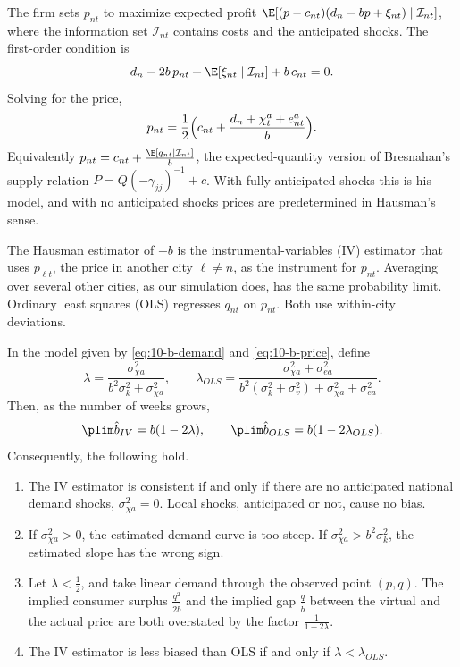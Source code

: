 The firm sets $p_{nt}$ to maximize expected profit $\E[(p - c_{nt})(d_n - bp + \xi_{nt})\mid\mathcal{I}_{nt}]$,
where the information set $\mathcal{I}_{nt}$ contains costs and the anticipated shocks. The first-order
condition is
\begin{equation*}
  d_n - 2b\,p_{nt} + \E[\xi_{nt}\mid\mathcal{I}_{nt}] + b\,c_{nt} = 0.
\end{equation*}
Solving for the price,
\begin{equation}\label{eq:10-b-price}
  p_{nt} = \frac{1}{2}\Bigl(c_{nt} + \frac{d_n + \chi^a_t + e^a_{nt}}{b}\Bigr).
\end{equation}
Equivalently $p_{nt} = c_{nt} + \frac{\E[q_{nt}\mid\mathcal{I}_{nt}]}{b}$, the expected-quantity version of
Bresnahan's supply relation $P = Q(-\gamma_{jj})^{-1} + c$. With fully anticipated shocks this is his model,
and with no anticipated shocks prices are predetermined in Hausman's sense.

The Hausman estimator of $-b$ is the instrumental-variables (IV) estimator that uses $p_{\ell t}$, the
price in another city $\ell\neq n$, as the instrument for $p_{nt}$. Averaging over several other cities, as
our simulation does, has the same probability limit. Ordinary least squares (OLS) regresses $q_{nt}$ on
$p_{nt}$. Both use within-city deviations.

\begin{proposition}\label{prop:10-hausman-iv-bias}
In the model given by \eqref{eq:10-b-demand} and \eqref{eq:10-b-price}, define
\begin{equation*}
  \lambda = \frac{\sigma_{\chi a}^2}{b^2\sigma_k^2 + \sigma_{\chi a}^2}, \qquad
  \lambda_{OLS} = \frac{\sigma_{\chi a}^2 + \sigma_{ea}^2}{b^2(\sigma_k^2 + \sigma_v^2) + \sigma_{\chi a}^2 + \sigma_{ea}^2}.
\end{equation*}
Then, as the number of weeks grows,
\begin{equation}\label{eq:10-b-plim}
  \plim\hat b_{IV} = b(1 - 2\lambda), \qquad \plim\hat b_{OLS} = b(1 - 2\lambda_{OLS}).
\end{equation}
Consequently, the following hold.
\begin{enumerate}[label=(\alph*)]
\item The IV estimator is consistent if and only if there are no anticipated national demand shocks,
$\sigma_{\chi a}^2 = 0$. Local shocks, anticipated or not, cause no bias.
\item If $\sigma_{\chi a}^2 > 0$, the estimated demand curve is too steep. If $\sigma_{\chi a}^2 > b^2\sigma_k^2$,
the estimated slope has the wrong sign.
\item Let $\lambda < \frac{1}{2}$, and take linear demand through the observed point $(p, q)$. The implied consumer surplus
$\frac{q^2}{2\hat b}$ and the implied gap $\frac{q}{\hat b}$ between the virtual and the actual price are
both overstated by the factor $\frac{1}{1 - 2\lambda}$.
\item The IV estimator is less biased than OLS if and only if $\lambda < \lambda_{OLS}$.
\end{enumerate}
\end{proposition}

